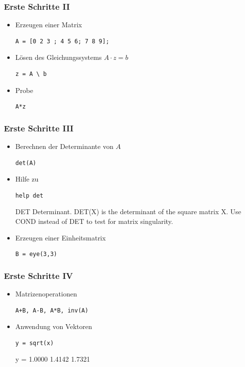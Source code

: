 \documentclass[hyperref={xetex}]{beamer}
\begin{document}
\begin{frame}[fragile]\frametitle{Erste Schritte II}
\begin{itemize}
\item Erzeugen einer Matrix
\begin{lstlisting}
A = [0 2 3 ; 4 5 6; 7 8 9];
\end{lstlisting}
\item Lösen des Gleichungssystems $A \cdot z=b$
\begin{lstlisting}
z = A \ b
\end{lstlisting}
\item Probe 
\begin{lstlisting}
A*z
\end{lstlisting}
\end{itemize}
\end{frame}
\begin{frame}[fragile]\frametitle{Erste Schritte III}
\begin{itemize}
\item Berechnen der Determinante von $A$
\begin{lstlisting}
det(A)
\end{lstlisting}
\item Hilfe zu  
\begin{lstlisting}
help det 
\end{lstlisting}
\begin{matlab}
DET    Determinant.
  DET(X) is the determinant of the square matrix X.
  Use COND instead of DET to test for matrix singularity.
\end{matlab}
\item Erzeugen einer Einheitsmatrix
\begin{lstlisting}
B = eye(3,3)
\end{lstlisting}
\end{itemize}
\end{frame}
\begin{frame}[fragile]\frametitle{Erste Schritte IV}
\begin{itemize}
\item Matrizenoperationen
\begin{lstlisting}
A+B, A-B, A*B, inv(A)
\end{lstlisting}
\item Anwendung von Vektoren
\begin{lstlisting}
y = sqrt(x)
\end{lstlisting}
\begin{matlab}
y =
    1.0000    1.4142    1.7321 
\end{matlab}

\end{itemize}
\end{frame}
\end{document}
